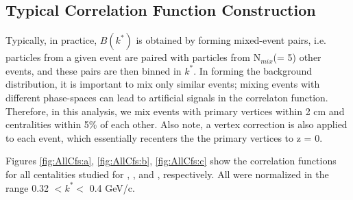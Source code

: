 \documentclass[../AnalysisNoteJBuxton.tex]{subfiles}
\begin{document}
\subsection{Typical Correlation Function Construction}
\label{TypicalCfConstruction}

Typically, in practice, $B(k^{*})$ is obtained by forming mixed-event pairs, i.e. particles from a given event are paired with particles from N$_{mix}$(= 5) other events, and these pairs are then binned in $k^{*}$.
In forming the background distribution, it is important to mix only similar events; mixing events with different phase-spaces can lead to artificial signals in the correlaton function.
Therefore, in this analysis, we mix events with primary vertices within 2 cm and centralities within 5\% of each other.
Also note, a vertex correction is also applied to each event, which essentially recenters the the primary vertices to z = 0.

Figures \ref{fig:AllCfs:a}, \ref{fig:AllCfs:b}, \ref{fig:AllCfs:c} show the correlation functions for all centalities studied for \LamKchPALamKchM, \LamKchMALamKchP, and \LamALamKs, respectively. All were normalized in the range 0.32 $< k^{*} < $ 0.4 GeV/c.
\end{document}
